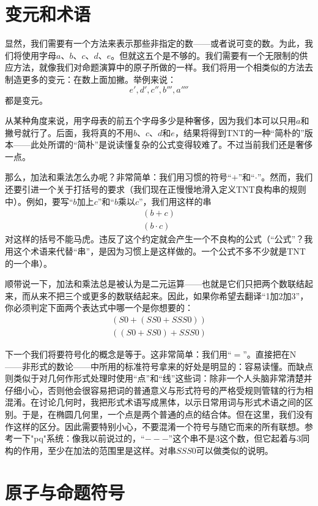 \section{变元和术语}

显然，我们需要有一个方法来表示那些非指定的数——或者说可变的数。为此，我们将使用字母$a$、$b$、$c$、$d$、$e$。但就这五个是不够的。我们需要有一个无限制的供应方法，就像我们对命题演算中的原子所做的一样。我们将用一个相类似的方法去制造更多的变元：在数上面加撇。举例来说：
\[
e', d', c'', b''', a''''
\]
都是变元。

从某种角度来说，用字母表的前五个字母多少是种奢侈，因为我们本可以只用$a$和撇号就行了。后面，我将真的不用$b$、$c$、$d$和$e$，结果将得到TNT的一种“简朴的”版本——此处所谓的“简朴”是说读懂复杂的公式变得较难了。不过当前我们还是奢侈一点。

那么，加法和乘法怎么办呢？非常简单：我们用习惯的符号“$+$”和“$\cdot$”。然而，我们还要引进一个关于打括号的要求（我们现在正慢慢地滑入定义TNT良构串的规则中）。例如，要写“$b$加上$c$”和“$b$乘以$c$”，我们用这样的串
\begin{gather*}
(b+c)\\
(b\cdot c)
\end{gather*}
对这样的括号不能马虎。违反了这个约定就会产生一个不良构的公式（“公式”？我用这个术语来代替“串”，是因为习惯上是这样做的。一个公式不多不少就是TNT的一个串）。

顺带说一下，加法和乘法总是被认为是二元运算——也就是它们只把两个数联结起来，而从来不把三个或更多的数联结起来。因此，如果你希望去翻译“1加2加3”，你必须判定下面两个表达式中哪一个是你想要的：
\begin{gather*}
(S0+(SS0+SSS0))\\
((S0+SS0)+SSS0)
\end{gather*}

下一个我们将要符号化的概念是等于。这非常简单：我们用“$=$”。直接把在N——非形式的数论——中所用的标准符号拿来的好处是明显的：容易读懂。而缺点则类似于对几何作形式处理时使用“点”和“线”这些词：除非一个人头脑非常清楚并仔细小心，否则他会很容易把词的普通意义与形式符号的严格受规则管辖的行为相混淆。在讨论几何时，我把形式术语写成黑体，以示日常用词与形式术语之间的区别。于是，在椭圆几何里，一个点是两个普通的点的结合体。但在这里，我们没有作这样的区分。因此需要特别小心，不要混淆一个符号与随它而来的所有联想。参考一下"pq"系统：像我以前说过的，“${-}{-}{-}$”这个串不是$3$这个数，但它起着与$3$同构的作用，至少在加法的范围里是这样。对串$SSS0$可以做类似的说明。

\section{原子与命题符号}

